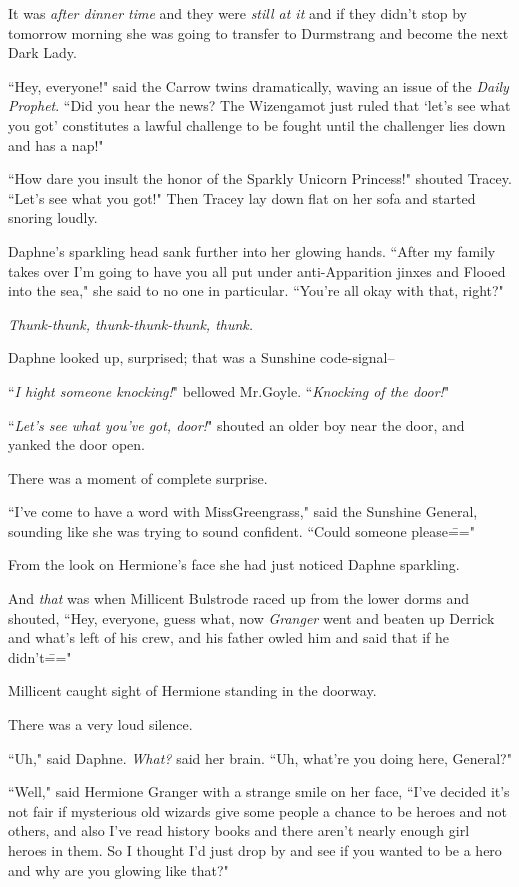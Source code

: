 It was \emph{after dinner time} and they were \emph{still at it} and if they didn't stop by tomorrow morning she was going to transfer to Durmstrang and become the next Dark Lady.

``Hey, everyone!" said the Carrow twins dramatically, waving an issue of the \emph{Daily Prophet}. ``Did you hear the news? The Wizengamot just ruled that `let's see what you got' constitutes a lawful challenge to be fought until the challenger lies down and has a nap!"

``How dare you insult the honor of the Sparkly Unicorn Princess!" shouted Tracey. ``Let's see what you got!" Then Tracey lay down flat on her sofa and started snoring loudly.

Daphne's sparkling head sank further into her glowing hands. ``After my family takes over I'm going to have you all put under anti-Apparition jinxes and Flooed into the sea," she said to no one in particular. ``You're all okay with that, right?"

\emph{Thunk-thunk, thunk-thunk-thunk, thunk.}

Daphne looked up, surprised; that was a Sunshine code-signal\---

``\emph{I hight someone knocking!}" bellowed Mr.\?Goyle. ``\emph{Knocking of the door!}"

``\emph{Let's see what you've got, door!}" shouted an older boy near the door, and yanked the door open.

There was a moment of complete surprise.

``I've come to have a word with Miss\?Greengrass," said the Sunshine General, sounding like she was trying to sound confident. ``Could someone please\==="

From the look on Hermione's face she had just noticed Daphne sparkling.

And \emph{that} was when Millicent Bulstrode raced up from the lower dorms and shouted, ``Hey, everyone, guess what, now \emph{Granger} went and beaten up Derrick and what's left of his crew, and his father owled him and said that if he didn't\==="

Millicent caught sight of Hermione standing in the doorway.

There was a very loud silence.

``Uh," said Daphne. \emph{What?} said her brain. ``Uh, what're you doing here, General?"

``Well," said Hermione Granger with a strange smile on her face, ``I've decided it's not fair if mysterious old wizards give some people a chance to be heroes and not others, and also I've read history books and there aren't nearly enough girl heroes in them. So I thought I'd just drop by and see if you wanted to be a hero and why are you glowing like that?"

